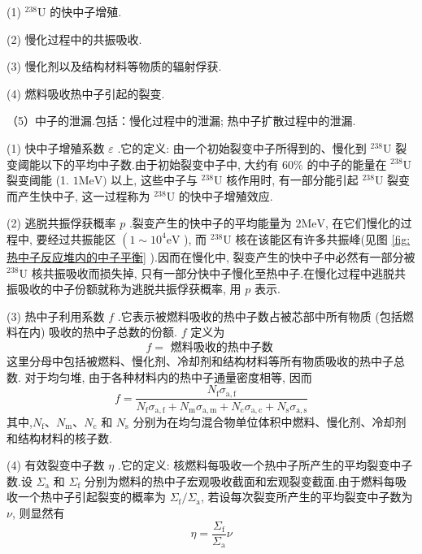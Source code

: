 \documentclass{Sichuan Normal University}
\begin{document}
(1) ${ }^{238} \mathrm{U}$ 的快中子增殖.

(2) 慢化过程中的共振吸收.

(3) 慢化剂以及结构材料等物质的辐射俘获.

(4) 燃料吸收热中子引起的裂变.

（5）中子的泄漏.包括：慢化过程中的泄漏; 热中子扩散过程中的泄漏.

(1) 快中子增殖系数 $\varepsilon$ .它的定义: 由一个初始裂变中子所得到的、慢化到 ${ }^{238} \mathrm{U}$ 裂变阈能以下的平均中子数.由于初始裂变中子中, 大约有 $60 \%$ 的中子的能量在 ${ }^{238} \mathrm{U}$ 裂变阈能 (1. $1 \mathrm{MeV})$ 以上, 这些中子与 ${ }^{238} \mathrm{U}$ 核作用时, 有一部分能引起 ${ }^{238} \mathrm{U}$ 裂变而产生快中子, 这一过程称为 ${ }^{238} \mathrm{U}$ 的快中子增殖效应.

(2) 逃脱共振俘获概率 $p$ .裂变产生的快中子的平均能量为 $2 \mathrm{MeV}$, 在它们慢化的过程中, 要经过共振能区 $\left(1 \sim 10^4 \mathrm{eV}\right.$ ), 而 ${ }^{238} \mathrm{U}$ 核在该能区有许多共振峰(见图 \ref{fig:热中子反应堆内的中子平衡} ).因而在慢化中, 裂变产生的快中子中必然有一部分被 ${ }^{238} \mathrm{U}$ 核共振吸收而损失掉, 只有一部分快中子慢化至热中子.在慢化过程中逃脱共振吸收的中子份额就称为逃脱共振俘获概率, 用 $p$ 表示.

(3) 热中子利用系数 $f$ .它表示被燃料吸收的热中子数占被芯部中所有物质 (包括燃料在内) 吸收的热中子总数的份额. $f$ 定义为
\begin{equation}
    f=\text { 燃料吸收的热中子数 }
\end{equation}
这里分母中包括被燃料、慢化剂、冷却剂和结构材料等所有物质吸收的热中子总数.
对于均匀堆, 由于各种材料内的热中子通量密度相等, 因而
\begin{equation}
    f=\frac{N_{\mathrm{f}} \sigma_{\mathrm{a}, \mathrm{f}}}{N_{\mathrm{f}} \sigma_{\mathrm{a}, \mathrm{f}}+N_{\mathrm{m}} \sigma_{\mathrm{a}, \mathrm{m}}+N_{\mathrm{c}} \sigma_{\mathrm{a}, \mathrm{c}}+N_{\mathrm{s}} \sigma_{\mathrm{a}, \mathrm{s}}}
\end{equation}
其中,$N_{\mathrm{f}} 、 N_{\mathrm{m}} 、 N_{\mathrm{c}}$ 和 $N_{\mathrm{s}}$ 分别为在均匀混合物单位体积中燃料、慢化剂、冷却剂和结构材料的核子数.

(4) 有效裂变中子数 $\eta$ .它的定义: 核燃料每吸收一个热中子所产生的平均裂变中子数.设 $\Sigma_{\mathrm{a}}$ 和 $\Sigma_{\mathrm{f}}$ 分别为燃料的热中子宏观吸收截面和宏观裂变截面.由于燃料每吸收一个热中子引起裂变的概率为 $\Sigma_{\mathrm{f}} / \Sigma_{\mathrm{a}}$, 若设每次裂变所产生的平均裂变中子数为 $\nu$, 则显然有
\begin{equation}
\eta=\frac{\Sigma_{\mathrm{f}}}{\Sigma_{\mathrm{a}}} \nu
\end{equation}
\end{document}
